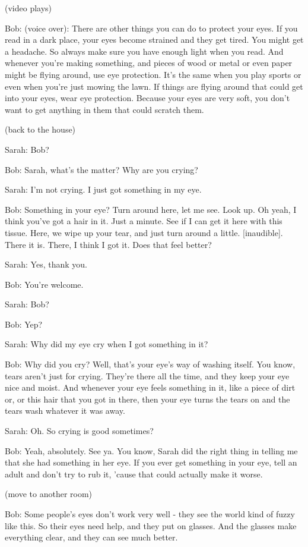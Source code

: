 (video plays)

Bob: (voice over): There are other things you can do to protect your eyes. If you read in a dark place, your eyes become strained and they get tired. You might get a headache. So always make sure you have enough light when you read. And whenever you're making something, and pieces of wood or metal or even paper might be flying around, use eye protection. It's the same when you play sports or even when you're just mowing the lawn. If things are flying around that could get into your eyes, wear eye protection. Because your eyes are very soft, you don't want to get anything in them that could scratch them.

(back to the house)

Sarah: Bob?

Bob: Sarah, what's the matter? Why are you crying?

Sarah: I'm not crying. I just got something in my eye.

Bob: Something in your eye? Turn around here, let me see. Look up. Oh yeah, I think you've got a hair in it. Just a minute. See if I can get it here with this tissue. Here, we wipe up your tear, and just turn around a little. [inaudible]. There it is. There, I think I got it. Does that feel better?

Sarah: Yes, thank you.

Bob: You're welcome.

Sarah: Bob?

Bob: Yep?

Sarah: Why did my eye cry when I got something in it?

Bob: Why did you cry? Well, that's your eye's way of washing itself. You know, tears aren't just for crying. They're there all the time, and they keep your eye nice and moist. And whenever your eye feels something in it, like a piece of dirt or, or this hair that you got in there, then your eye turns the tears on and the tears wash whatever it was away.

Sarah: Oh. So crying is good sometimes?

Bob: Yeah, absolutely. See ya. You know, Sarah did the right thing in telling me that she had something in her eye. If you ever get something in your eye, tell an adult and don't try to rub it, 'cause that could actually make it worse.

(move to another room)

Bob: Some people's eyes don't work very well - they see the world kind of fuzzy like this. So their eyes need help, and they put on glasses. And the glasses make everything clear, and they can see much better.

